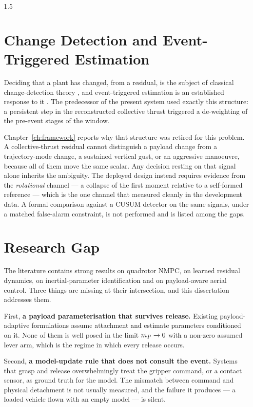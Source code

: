 \begin{spacing}{1.5}
\section{Change Detection and Event-Triggered Estimation}

Deciding that a plant has changed, from a residual, is the subject of classical
change-detection theory \cite{basseville1993}, and event-triggered estimation is
an established response to it \cite{heemels2012}. The predecessor of the present
system used exactly this structure: a persistent step in the reconstructed
collective thrust triggered a de-weighting of the pre-event stages of the window.

Chapter~\ref{ch:framework} reports why that structure was retired for this
problem. A collective-thrust residual cannot distinguish a payload change from a
trajectory-mode change, a sustained vertical gust, or an aggressive manoeuvre,
because all of them move the same scalar. Any decision resting on that signal
alone inherits the ambiguity. The deployed design instead requires evidence from
the \emph{rotational} channel --- a collapse of the first moment relative to a
self-formed reference --- which is the one channel that measured cleanly in the
development data. A formal comparison against a CUSUM detector on the same
signals, under a matched false-alarm constraint, is not performed and is listed
among the gaps.

\section{Research Gap}

The literature contains strong results on quadrotor NMPC, on learned residual
dynamics, on inertial-parameter identification and on payload-aware aerial
control. Three things are missing at their intersection, and this dissertation
addresses them.

First, \textbf{a payload parameterisation that survives release.} Existing
payload-adaptive formulations assume attachment and estimate parameters
conditioned on it. None of them is well posed in the limit $m_P\to0$ with a
non-zero assumed lever arm, which is the regime in which every release occurs.

Second, \textbf{a model-update rule that does not consult the event.} Systems
that grasp and release overwhelmingly treat the gripper command, or a contact
sensor, as ground truth for the model. The mismatch between command and physical
detachment is not usually measured, and the failure it produces --- a loaded
vehicle flown with an empty model --- is silent.


\end{spacing}
